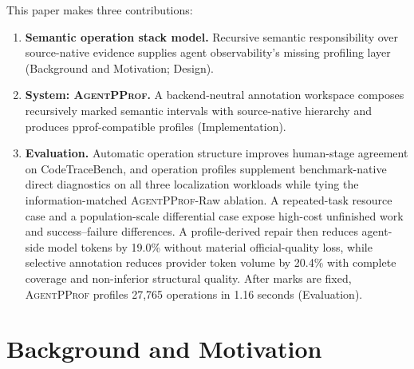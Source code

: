 \documentclass[letterpaper]{article}
\newcommand{\sys}{\textsc{AgentPProf}\xspace}
\begin{document}
This paper makes three contributions:

\begin{enumerate}
\item \textbf{Semantic operation stack model.}
  Recursive semantic responsibility over source-native evidence supplies agent
  observability's missing profiling layer (Background and Motivation; Design).
\item \textbf{System: \sys.}
  A backend-neutral annotation workspace composes recursively marked semantic
  intervals with source-native hierarchy and produces pprof-compatible profiles
  (Implementation).
\item \textbf{Evaluation.}
  Automatic operation structure improves human-stage agreement on
  CodeTraceBench, and operation profiles supplement benchmark-native direct
  diagnostics on all three localization workloads while tying the
  information-matched \sys-Raw ablation. A repeated-task resource case
  and a population-scale differential case expose high-cost unfinished work and
  success--failure differences. A profile-derived repair then reduces
  agent-side model tokens by 19.0\% without material official-quality loss,
  while selective annotation reduces provider token volume by 20.4\% with
  complete coverage and non-inferior structural quality. After marks are fixed,
  \sys profiles 27{,}765 operations in 1.16 seconds
  (Evaluation).
\end{enumerate}

\section{Background and Motivation}
\label{sec:background}
\end{document}
